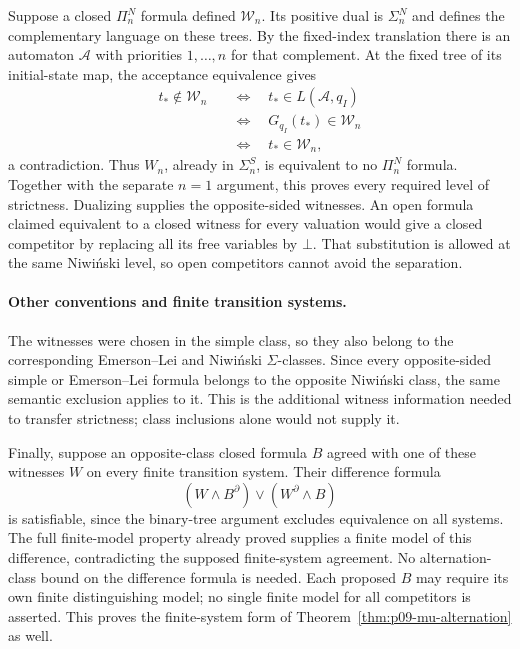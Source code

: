 Suppose a closed
\(\Pi_n^N\) formula
defined \(\mathcal W_n\).
Its positive dual is
\(\Sigma_n^N\) and
defines the complementary
language on these trees.
By the fixed-index
translation there is
an automaton \(\mathcal A\)
with priorities \(1,\ldots,n\)
for that complement.
At the fixed tree of
its initial-state map,
the acceptance equivalence
gives
\[
\begin{aligned}
 t_*\notin\mathcal W_n
 &\quad\Longleftrightarrow\quad t_*\in L(\mathcal A,q_I)\\
 &\quad\Longleftrightarrow\quad G_{q_I}(t_*)\in\mathcal W_n\\
 &\quad\Longleftrightarrow\quad t_*\in\mathcal W_n,
\end{aligned}
\]
a contradiction.
Thus \(W_n\), already
in \(\Sigma_n^S\),
is equivalent to no
\(\Pi_n^N\) formula.
Together with the separate
\(n=1\) argument, this
proves every required
level of strictness.
Dualizing supplies the
opposite-sided witnesses.
An open formula claimed
equivalent to a closed
witness for every valuation
would give a closed competitor
by replacing all its free
variables by \(\bot\).
That substitution is allowed
at the same Niwi\'nski level,
so open competitors cannot
avoid the separation.

\paragraph{Other conventions and finite transition systems.}
The witnesses were chosen
in the simple class,
so they also belong
to the corresponding
Emerson--Lei and Niwi\'nski
\(\Sigma\)-classes.
Since every opposite-sided
simple or Emerson--Lei
formula belongs to the
opposite Niwi\'nski class,
the same semantic exclusion
applies to it.
This is the additional
witness information needed
to transfer strictness;
class inclusions alone
would not supply it.

Finally, suppose an
opposite-class closed
formula \(B\) agreed
with one of these
witnesses \(W\) on
every finite transition
system. Their difference
formula
\[
 (W\land B^\partial)
     \lor(W^\partial\land B)
\]
is satisfiable, since
the binary-tree argument
excludes equivalence on
all systems.
The full finite-model
property already proved
supplies a finite model
of this difference,
contradicting the supposed
finite-system agreement.
No alternation-class bound
on the difference formula
is needed.
Each proposed \(B\)
may require its own
finite distinguishing
model; no single finite
model for all competitors
is asserted.
This proves the finite-system
form of
Theorem~\ref{thm:p09-mu-alternation}
as well.
